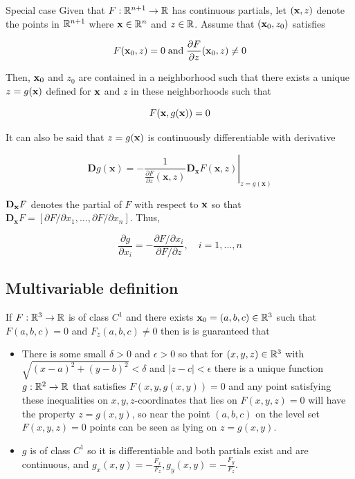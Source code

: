 \begin{mybox}{Special case} 
    Given that $F:\mathbb{R}^{n+1}\to \mathbb{R}$ has continuous partials, let $(\textbf x, z)$ denote the points in $\mathbb{R}^{n+1}$
    where $\textbf x\in \mathbb{R}^n$ and $z\in \mathbb{R}$. Assume that $(\textbf x_0,z_0)$ satisfies

    \[F(\textbf x_0,z)=0\;\text{and}\;\frac{\partial F}{\partial z}(\textbf x_0,z)\neq 0\]

    Then, $\textbf x_0$ and $z_0$ are contained in a neighborhood such that there exists a unique $z=g(\textbf x)$ defined for $\textbf x$ and $z$ in these neighborhoods such that

    \[F(\textbf x, g(\textbf x))=0\]

    It can also be said that $z=g(\textbf x)$ is continuously differentiable with derivative 

    \[\mathbf{D} g(\mathbf{x})=-\left.\frac{1}{\frac{\partial F}{\partial z}(\mathbf{x}, z)} \mathbf{D}_{\mathbf{x}} F(\mathbf{x}, z)\right|_{z=g(\mathbf{x})}\]

    $\textbf D_{\textbf x}F$ denotes the partial of $F$ with respect to $\textbf x$ so that $\mathbf{D}_{\mathbf{x}} F=\left[\partial F / \partial x_{1}, \ldots, \partial F / \partial x_{n}\right]$.
    Thus, 

    \[\frac{\partial g}{\partial x_{i}}=-\frac{\partial F / \partial x_{i}}{\partial F / \partial z}, \quad i=1, \ldots, n\]
\end{mybox}

\subsection{Multivariable definition}

If $F:\mathbb{R}^3\to \mathbb{R}$ is of class $C^1$ and there exists $\textbf{x}_0=(a,b,c)\in\mathbb{R}^3$ such that
$F(a,b,c)=0$ and $F_z(a,b,c)\neq 0$ then is is guaranteed that
\begin{itemize}
    \item There is some small $\delta > 0$ and $\epsilon > 0$ so that for $(x,y,z)\in\mathbb{R}^3$ with $\sqrt{(x-a)^2+(y-b)^2}<\delta$ and $|z-c|<\epsilon$ there is a unique function $g:\mathbb{R}^2\to\mathbb{R}$
    that satisfies $F(x,y,g(x,y))=0$ and any point satisfying these inequalities on $x,y,z$-coordinates that lies on $F(x,y,z)=0$ will have the property $z=g(x,y)$, so near the point $(a,b,c)$ on the level set $F(x,y,z)=0$ points can be seen as lying on $z=g(x,y)$.
    \item $g$ is of class $C^1$ so it is differentiable and both partials exist and are continuous, and $g_x(x,y)=-\frac{F_x}{F_z},g_y(x,y)=-\frac{F_y}{F_z}$.
\end{itemize}

